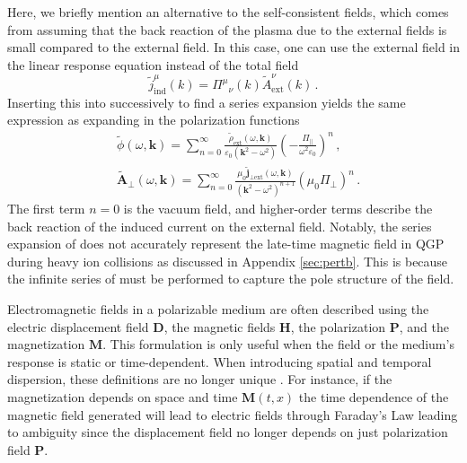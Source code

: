 Here, we briefly mention an alternative to the self-consistent fields, which comes from assuming that the back reaction of the plasma due to the external fields is small compared to the external field. In this case, one can use the external field in the linear response equation instead of the total field
\begin{equation}\label{eq:pert}
    \widetilde{j}_{\mathrm{ind}}^{\mu}(k) = {\Pi^{\mu}}_{\nu}(k) \widetilde{A}_\text{ext}^{\nu}(k)\,.
\end{equation}
Inserting this into  successively to find a series expansion yields the same expression as expanding  in the polarization functions
\begin{align}\label{eq:phipert}
&\widetilde{\phi}(\omega,\boldsymbol{k}) = \sum_{n=0}^\infty\frac{\widetilde{\rho}_\text{ext}(\omega,\boldsymbol{k})}{\varepsilon_0(\boldsymbol{k}^2-\omega^2)}\left(-\frac{\Pi_{\parallel}}{ \omega^2\varepsilon_0}\right)^n\,, \\\label{eq:aperppert}
&\widetilde{\boldsymbol{A}}_\perp(\omega,\boldsymbol{k}) = \sum_{n=0}^\infty\frac{\mu_0 \widetilde{\boldsymbol{j}}_{\perp \text{ext}}(\omega,\boldsymbol{k})}{(\boldsymbol{k}^2 - \omega^2)^{n+1}}(\mu_0 \Pi_{\perp})^{n}\,.
\end{align}
The first term $n=0$ is the vacuum field, and higher-order terms describe the back reaction of the induced current on the external field. Notably, the series expansion of  does not accurately represent the late-time magnetic field in QGP during heavy ion collisions as discussed in Appendix \ref{sec:pertb}. This is because the infinite series of  must be performed to capture the pole structure of the field. 

Electromagnetic fields in a polarizable medium are often described using the electric displacement field $\mathbf{D}$, the magnetic fields $\mathbf{H}$, the polarization $\mathbf{P}$, and the magnetization $\mathbf{M}$. This formulation is only useful when the field or the medium's response is static or time-dependent. When introducing spatial and temporal dispersion, these definitions are no longer unique \cite{melrose2008quantum}. For instance, if the magnetization depends on space and time $\mathbf{M}(t,x)$ the time dependence of the magnetic field generated will lead to electric fields through Faraday's Law leading to ambiguity since the displacement field no longer depends on just polarization field $\mathbf{P}$.



